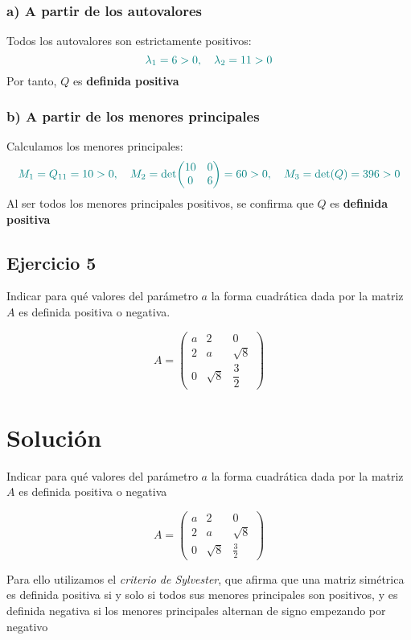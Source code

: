 \documentclass{article}
\begin{document}
\subsubsection*{a) A partir de los autovalores}

Todos los autovalores son estrictamente positivos:
\[
\color{teal}
\lambda_1 = 6 > 0,\quad \lambda_2 = 11 > 0
\]
Por tanto, \(Q\) es \textbf{definida positiva}

\subsubsection*{b) A partir de los menores principales}

Calculamos los menores principales:
\[
\color{teal}
M_1 = Q_{11} = 10 > 0,
\quad
M_2 = \det\!\begin{pmatrix}10 & 0\\0 & 6\end{pmatrix} = 60 > 0,
\quad
M_3 = \det(Q) = 396 > 0
\]
Al ser todos los menores principales positivos, se confirma que \(Q\) es \textbf{definida positiva}  

\newpage
\subsection{Ejercicio 5}



Indicar para qué valores del parámetro \( a \) la forma cuadrática dada por la matriz \( A \) es definida positiva o negativa.

\[
A =
\begin{pmatrix}
a & 2 & 0 \\
2 & a & \sqrt{8} \\
0 & \sqrt{8} & \dfrac{3}{2}
\end{pmatrix}
\]

\newpage
\section*{Solución}

Indicar para qué valores del parámetro \(a\) la forma cuadrática dada por la matriz \(A\) es definida positiva o negativa

\[
A =
\begin{pmatrix}
a & 2 & 0\\[6pt]
2 & a & \sqrt{8}\\[3pt]
0 & \sqrt{8} & \tfrac32
\end{pmatrix}
\]

Para ello utilizamos el \emph{criterio de Sylvester}, que afirma que una matriz simétrica es definida positiva si y solo si todos sus menores principales son positivos, y es definida negativa si los menores principales alternan de signo empezando por negativo
\end{document}
